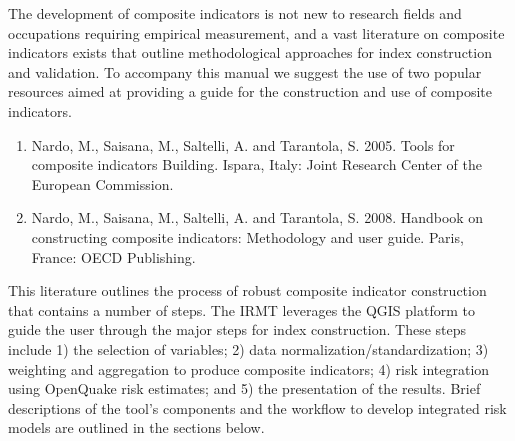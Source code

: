 The development of composite indicators is not new to research fields and
occupations requiring empirical measurement, and a vast literature on composite
indicators exists that outline methodological approaches for index construction
and validation. To accompany this manual we suggest the use of two popular
resources aimed at providing a guide for the construction and use of composite
indicators.

\begin{enumerate}
    \item Nardo, M., Saisana, M., Saltelli, A. and Tarantola, S. 2005. Tools
        for composite indicators Building. Ispara, Italy: Joint Research Center
        of the European Commission.
    \item Nardo, M., Saisana, M., Saltelli, A. and Tarantola, S. 2008. Handbook
        on constructing composite indicators: Methodology and user guide.
        Paris, France: OECD Publishing.
\end{enumerate}

This literature outlines the process of robust composite indicator construction
that contains a number of steps. The IRMT leverages the QGIS platform to guide
the user through the major steps for index construction. These steps include 1)
the selection of variables; 2) data normalization/standardization; 3) weighting
and aggregation to produce composite indicators; 4) risk integration using
OpenQuake risk estimates; and 5) the presentation of the results. Brief
descriptions of the tool's components and the workflow to develop integrated
risk models are outlined in the sections below.
